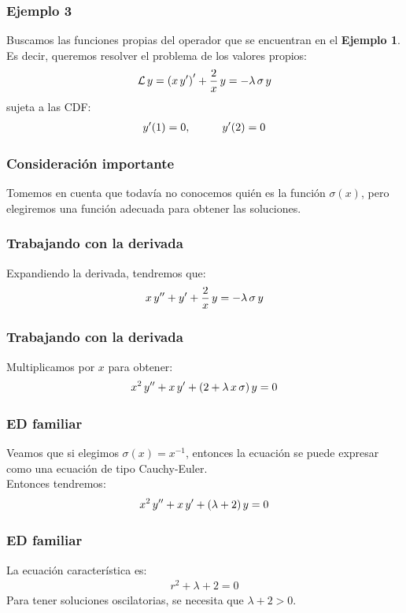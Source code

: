 \documentclass[12pt]{beamer}
\begin{document}
\begin{frame}
\frametitle{Ejemplo 3}
Buscamos las funciones propias del operador que se encuentran en el \textbf{Ejemplo 1}. 
\\
\bigskip
\pause
Es decir, queremos resolver el problema de los valores propios:\
\pause
\begin{align}
\mathcal{L} \, y = \left( x \, {y}^{\prime} \right)^{\prime} + \dfrac{2}{x} \, y = - \lambda \, \sigma \, y
\label{eq:ecuacion_04_14}
\end{align}
sujeta a las CDF:
\begin{align*}
{y}^{\prime} (1) = 0, \hspace{1cm} {y}^{\prime}(2) = 0
\end{align*}
\end{frame}
\begin{frame}
\frametitle{Consideración importante}
Tomemos en cuenta que todavía no conocemos quién es la función $\sigma (x)$, pero elegiremos una función adecuada para obtener las soluciones.
\end{frame}
\begin{frame}
\frametitle{Trabajando con la derivada}
Expandiendo la derivada, tendremos que:
\pause
\begin{align*}
x \, {y}^{\prime \prime} + {y}^{\prime} + \dfrac{2}{x} \, y = - \lambda \, \sigma \, y
\end{align*}
\end{frame}
\begin{frame}
\frametitle{Trabajando con la derivada}
Multiplicamos por $x$ para obtener:
\pause
\begin{align*}
x^{2} \, {y}^{\prime \prime} + x \, {y}^{\prime} + (2 + \lambda \, x \,  \sigma) \, y = 0
\end{align*}
\end{frame}
\begin{frame}
\frametitle{ED familiar}
Veamos que si elegimos $\sigma(x) = x^{-1}$, entonces la ecuación se puede expresar como una ecuación de tipo Cauchy-Euler.
\\
\bigskip
\pause
Entonces tendremos:
\pause
\begin{align*}
x^{2} \, {y}^{\prime \prime} + x \, {y}^{\prime} + (\lambda + 2) \, y = 0
\end{align*}
\end{frame}
\begin{frame}
\frametitle{ED familiar}
La ecuación característica es:
\pause
\begin{align*}
r^{2} + \lambda + 2 = 0
\end{align*}
\pause
Para tener soluciones oscilatorias, se necesita que $\lambda + 2 > 0$.
\end{frame}
\end{document}
